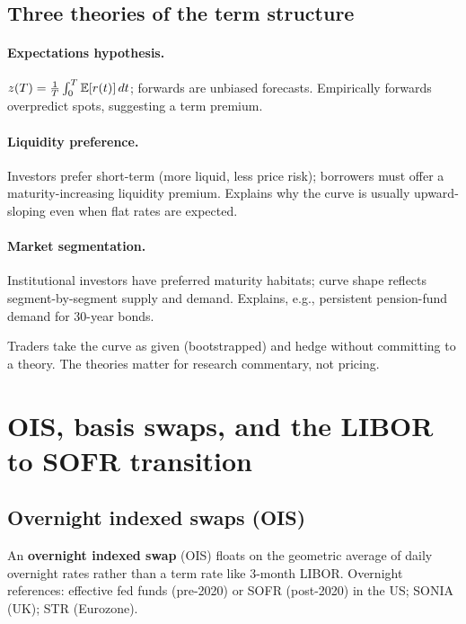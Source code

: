 \subsection{Three theories of the term structure}

\paragraph{Expectations hypothesis.}
$z(T) = \frac{1}{T}\int_0^T \mathbb{E}[r(t)]\,dt$; forwards are unbiased
forecasts.  Empirically forwards overpredict spots, suggesting a
term premium.

\paragraph{Liquidity preference.}
Investors prefer short-term (more liquid, less price risk); borrowers
must offer a maturity-increasing liquidity premium.  Explains why the
curve is usually upward-sloping even when flat rates are expected.

\paragraph{Market segmentation.}
Institutional investors have preferred maturity habitats; curve shape
reflects segment-by-segment supply and demand.  Explains, e.g.,
persistent pension-fund demand for 30-year bonds.

Traders take the curve as given (bootstrapped) and hedge without
committing to a theory.  The theories matter for research
commentary, not pricing.


\section{OIS, basis swaps, and the LIBOR to SOFR transition}
\label{sec:fi_ois_sofr}

\subsection{Overnight indexed swaps (OIS)}

An \textbf{overnight indexed swap} (OIS) floats on the geometric
average of daily overnight rates rather than a term rate like 3-month
LIBOR.  Overnight references: effective fed funds (pre-2020) or SOFR
(post-2020) in the US; SONIA (UK); \texteuro STR (Eurozone).

